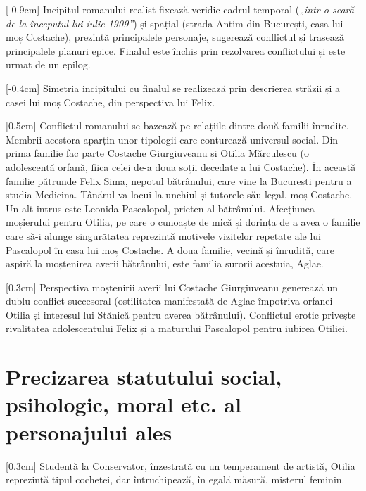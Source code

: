 [-0.9cm]
Incipitul romanului realist fixează veridic cadrul temporal (\textit{„într-o seară de la începutul lui iulie 1909”}) și spațial (strada Antim din București, casa lui moș Costache), prezintă principalele personaje, sugerează conflictul și trasează principalele planuri epice. Finalul este închis prin rezolvarea conflictului și este urmat de un epilog.

[-0.4cm]
Simetria incipitului cu finalul se realizează prin descrierea străzii și a casei lui moș Costache, din perspectiva lui Felix.

[0.5cm]
Conflictul romanului se bazează pe relațiile dintre două familii înrudite. Membrii acestora aparțin unor tipologii care conturează universul social. Din prima familie fac parte Costache Giurgiuveanu și Otilia Mărculescu (o adolescentă orfană, fiica celei de-a doua soții decedate a lui Costache). În această familie pătrunde Felix Sima, nepotul bătrânului, care vine la București pentru a studia Medicina. Tânărul va locui la unchiul și tutorele său legal, moș Costache. Un alt intrus este Leonida Pascalopol, prieten al bătrânului. Afecțiunea moșierului pentru Otilia, pe care o cunoaște de mică și dorința de a avea o familie care să-i alunge singurătatea reprezintă motivele vizitelor repetate ale lui Pascalopol în casa lui moș Costache. A doua familie, vecină și înrudită, care aspiră la moștenirea averii bătrânului, este familia surorii acestuia, Aglae.

[0.3cm]
Perspectiva moștenirii averii lui Costache Giurgiuveanu generează un dublu conflict succesoral (ostilitatea manifestată de Aglae împotriva orfanei Otilia și interesul lui Stănică pentru averea bătrânului). Conflictul erotic privește rivalitatea adolescentului Felix și a maturului Pascalopol pentru iubirea Otiliei.


\section{Precizarea statutului social, psihologic, moral etc. al personajului ales}

[0.3cm]
Studentă la Conservator, înzestrată cu un temperament de artistă, Otilia reprezintă tipul cochetei, dar întruchipează, în egală măsură, misterul feminin.

